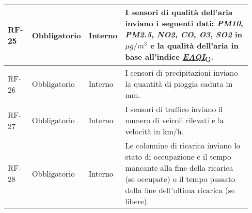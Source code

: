 \begin{longtable}{|>{\centering\arraybackslash}m{}|>{\centering\arraybackslash}m{}|>{\centering\arraybackslash}m{}|>{\centering\arraybackslash}m{}|}
	RF-25           & Obbligatorio        & Interno                                                                                                           & I sensori di qualità dell'aria inviano i seguenti dati: \textit{PM10}, \textit{PM2.5}, \textit{NO2}, \textit{CO}, \textit{O3}, \textit{SO2} in $\mu g/m^3$ e la qualità dell'aria in base all'indice \href{https://7last.github.io/docs/rtb/documentazione-interna/glossario\#european-air-quality-index}{\textit{EAQI}\textsubscript{G}}.                                                                                                                                                           \\\hline
	RF-26           & Obbligatorio        & Interno                                                                                                           & I sensori di precipitazioni inviano la quantità di pioggia caduta in mm.                                                                                                                                                                                                                                                                                                                                                                                                                             \\\hline
	RF-27           & Obbligatorio        & Interno                                                                                                           & I sensori di traffico inviano il numero di veicoli rilevati e la velocità in km/h.                                                                                                                                                                                                                                                                                                                                                                                                                   \\\hline
	RF-28           & Obbligatorio        & Interno                                                                                                           & Le colonnine di ricarica inviano lo stato di occupazione e il tempo mancante alla fine della ricarica (se occupate) o il tempo passato dalla fine dell'ultima ricarica (se libere).                                                                                                                                                                                                                                                                                                                  \\\hline

\end{longtable}
